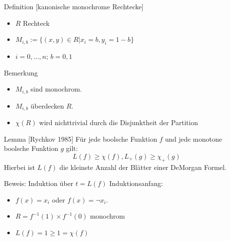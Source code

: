 \begin{frame}
    \begin{block}{Definition [kanonische monochrome Rechtecke]}
        \begin{itemize}
            \item $R$ Rechteck
            \item $M_{i,b} := \{ (x,y) \in R \vert x_i = b, y_i = 1 - b \}$
            \item $i=0, \ldots, n$; $b=0,1$
        \end{itemize}
        
    \end{block}
    \pause
    \begin{block}{Bemerkung}
        \begin{itemize}
            \item $M_{i,b}$ sind monochrom.
            \item $M_{i,b}$ überdecken $R$.
            \item $\chi (R)$ wird nichttrivial durch die Disjunktheit der Partition
        \end{itemize}
        
    \end{block}
\end{frame}

\begin{frame}
    \begin{block}{Lemma [Rychkov 1985]}
        Für jede boolsche Funktion $f$ und jede monotone boolsche Funktion $g$ gilt:
        \[
            L(f) \geq \chi (f), L_+ (g) \geq \chi_+ (g)
        \]
        Hierbei ist $L(f)$ die kleinste Anzahl der Blätter einer DeMorgan Formel.
    \end{block}
\end{frame}

\begin{frame}[t]
    Beweis: Induktion über $t = L(f)$
    \newline
    \newline
    Induktionsanfang:
    \begin{itemize}
        \pause
        \item $f(x) = x_i$ oder $f(x) = \neg x_i$.
        \pause
        \item $R = f^{-1}(1)\times f^{-1}(0)$ monochrom
        \pause
        \item $L(f) = 1 \geq 1 = \chi (f)$
    \end{itemize}
\end{frame}

